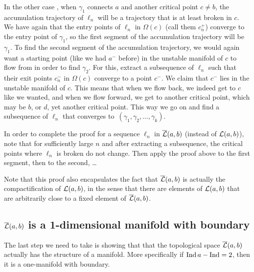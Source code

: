 \begin{myproof}
    In the other case , when $\gamma_1$ connects $a$ and another critical point $c \neq b$, the accumulation trajectory of $\ell_n$ will be a trajectory that is at least broken in $c$.
We have again that the entry points of $\ell_n$ in $\Omega(c)$ (call them $c_n^{+}$) converge to the entry point of $\gamma_1$, so the first segment of the accumulation trajectory will be $\gamma_1$.
To find the second segment of the accumulation trajectory, we would again want a starting point (like we had $a^{-}$ before) in the unstable manifold of $c$ to flow from in order to find $\gamma_{2}$.
For this, extract a subsequence of $\ell_n$ such that their exit points $c^{-}_n$ in $\Omega(c)$ converge to a point $c^{-}$.
We claim that $c^{-}$ lies in the unstable manifold of $c$.
This means that when we flow back, we indeed get to $c$ like we wanted, and when we flow forward, we get to another critical point, which may be $b$, or $d$, yet another critical point. This way we go on and find a subsequence of $\ell_n$ that converges to~$(\gamma_1, \gamma_2, \ldots, \gamma_k)$.

In order to complete the proof for a sequence $\ell_n$ in $ \overline{\mathcal L}(a, b)$ (instead of $\mathcal L(a, b)$), note that for sufficiently large $n$ and after extracting a subsequence, the critical points where $ \ell_n$ is broken do not change. Then apply the proof above to the first segment, then to the second, \ldots
\end{myproof}

Note that this proof also encapsulates the fact that $\overline{\mathcal L}(a, b)$ is actually the compactification of  $\mathcal L(a, b)$, in the sense that there are elements of  $\mathcal L(a, b)$ that are arbitrarily close to a fixed element of $\overline{\mathcal L}(a, b)$.


\subsection{$\overline{\mathcal L}(a, b)$ is a 1-dimensional manifold with boundary}

The last step we need to take is showing that that the topological space $\overline{\mathcal L}(a, b)$ actually has the structure of a manifold.
More specifically if $\operatorname{Ind} a - \operatorname{Ind} = 2$, then it is a one-manifold with boundary.

